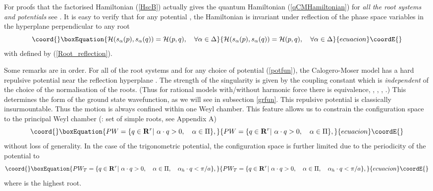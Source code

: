 \documentclass[a4paper,12pt]{article}
\begin{document}
For proofs that the factorised Hamiltonian (\ref{HscB}) actually gives
the quantum Hamiltonian (\ref{qCMHamiltonian}) for
{\em all the root systems and
potentials\/} see \cite{OP2,OP3,bms}. It is easy to
verify that for any potential
\coordHE{}, the Hamiltonian is invariant under reflection of the phase space
variables in the hyperplane perpendicular to any root
\begin{equation}\coord{}\boxEquation{
  {\cal H}(s_{\alpha}(p),s_{\alpha}(q))={\cal H}(p,q), \quad
   \forall\alpha\in\Delta
  \label{HamCoxinv}
}{
  {\cal H}(s_{\alpha}(p),s_{\alpha}(q))={\cal H}(p,q), \quad
   \forall\alpha\in\Delta
  }{ecuacion}\coordE{}\end{equation}
with \coordHE{} defined by (\ref{Root_reflection}).



Some remarks are in order. For all of the root systems and for
any choice of potential (\ref{potfun}),
the  Calogero-Moser model has a hard repulsive potential \coordHE{} near the reflection hyperplane
\coordHE{}.
The strength of the singularity is given by
the coupling constant \coordHE{}
which is {\em independent\/} of the choice of the normalisation of the
roots.
(Thus for rational models with/without harmonic force there is equivalence,
\coordHE{}, \coordHE{}, \coordHE{},
\coordHE{}.) This determines the form of the ground state wavefunction, as we
will see in subsection \ref{grfun}.
This repulsive potential is classically insurmountable.
Thus the motion is always
confined within one Weyl chamber.
This  feature allows us to constrain the configuration space to
the principal Weyl chamber (\myHighlight{\(\Pi\)}\coordHE{}: set of simple roots, see Appendix A)
\begin{equation}\coord{}\boxEquation{
   PW=\{q\in{\bf R}^r|\ \alpha\cdot q>0,\quad \alpha\in\Pi\},
   \label{PW}
}{
   PW=\{q\in{\bf R}^r|\ \alpha\cdot q>0,\quad \alpha\in\Pi\},
   }{ecuacion}\coordE{}\end{equation}
without loss of generality.
In the case of the trigonometric potential, the configuration space is
further
limited due to the periodicity of the potential to
\begin{equation}\coord{}\boxEquation{
   PW_T=\{q\in{\bf R}^r|\ \alpha\cdot q>0,\quad \alpha\in\Pi,
   \quad \alpha_h\cdot q<\pi/a\},
   \label{PWT}
}{
   PW_T=\{q\in{\bf R}^r|\ \alpha\cdot q>0,\quad \alpha\in\Pi,
   \quad \alpha_h\cdot q<\pi/a\},
   }{ecuacion}\coordE{}\end{equation}
where \coordHE{} is the highest root.
\end{document}
